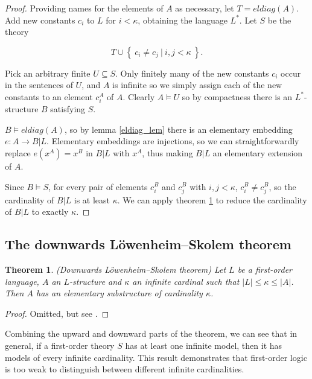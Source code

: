 \documentclass[10pt, a4paper, oneside]{article}
\newtheorem{thm}{Theorem}[section]
\theoremstyle{definition}
\theoremstyle{remark}
\theoremstyle{plain}
\theoremstyle{plain}
\begin{document}
\begin{proof}
    Providing names for the elements of $A$ as necessary, let $T = eldiag(A)$.
    Add new constants $c_i$ to $L$ for $i < \kappa$, obtaining the language
    $L^*$. Let $S$ be the theory
    
    \begin{displaymath}
        T \cup \left\{\ c_i \neq c_j\ |\ i, j < \kappa\ \right\}.
    \end{displaymath}
    
    Pick an arbitrary finite $U \subseteq S$. Only finitely many of the new
    constants $c_i$ occur in the sentences of $U$, and $A$ is infinite so we
    simply assign each of the new constants to an element $c^A_i$ of $A$.
    Clearly $A \models U$ so by compactness there is an $L^*$-structure $B$
    satisfying $S$.
    
    $B \models eldiag(A)$, so by lemma \ref{eldiag_lem} there is an elementary
    embedding $e : A \rightarrow B | L$. Elementary embeddings are injections,
    so we can straightforwardly replace $e(x^A) = x^B$ in $B | L$ with $x^A$,
    thus making $B | L$ an elementary extension of $A$.
    
    Since $B \models S$, for every pair of elements $c^B_i$ and $c^B_j$ with
    $i, j < \kappa$, $c^B_i \neq c^B_j$, so the cardinality of $B | L$ is at
    least $\kappa$. We can apply theorem \ref{down_lst} to reduce the
    cardinality of $B | L$ to exactly $\kappa$.
\end{proof}

\subsection{The downwards Löwenheim--Skolem theorem}

\begin{thm}
    \label{down_lst}
    (Downwards Löwenheim--Skolem theorem)
    Let $L$ be a first-order language, $A$ an $L$-structure and $\kappa$ an
    infinite cardinal such that $|L| \leq \kappa \leq |A|$. Then $A$ has an
    elementary substructure of cardinality $\kappa$.
\end{thm}

\begin{proof}
    Omitted, but see \citealt[pp. 69--72]{hodges1997}.
\end{proof}

Combining the upward and downward parts of the theorem, we can see that in
general, if a first-order theory $S$ has at least one infinite model, then it
has models of every infinite cardinality. This result demonstrates that
first-order logic is too weak to distinguish between different infinite
cardinalities.
\end{document}
